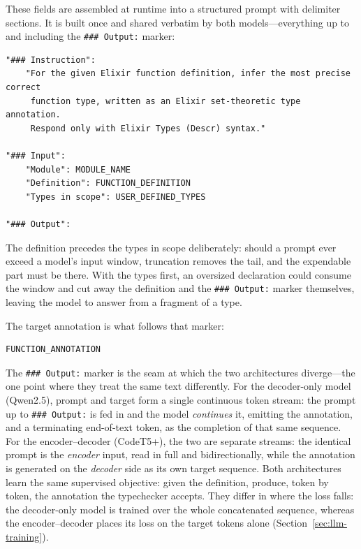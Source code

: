 These fields are assembled at runtime into a structured prompt with delimiter sections. It is built once and shared verbatim by both models---everything up to and including the \texttt{\#\#\# Output:} marker:
\begin{lstlisting}[numbers=none]
"### Instruction":
    "For the given Elixir function definition, infer the most precise correct
     function type, written as an Elixir set-theoretic type annotation.
     Respond only with Elixir Types (Descr) syntax."

"### Input":
    "Module": MODULE_NAME
    "Definition": FUNCTION_DEFINITION
    "Types in scope": USER_DEFINED_TYPES

"### Output":
\end{lstlisting}
The definition precedes the types in scope deliberately: should a prompt ever exceed a model's input window, truncation removes the tail, and the expendable part must be there.
With the types first, an oversized declaration could consume the window and cut away the definition and the \texttt{\#\#\# Output:} marker themselves, leaving the model to answer from a fragment of a type.

The target annotation is what follows that marker:
\begin{lstlisting}[numbers=none]
    FUNCTION_ANNOTATION
\end{lstlisting}
The \texttt{\#\#\# Output:} marker is the seam at which the two architectures diverge---the one point where they treat the same text differently.
For the decoder-only model (Qwen2.5), prompt and target form a single continuous token stream: the prompt up to \texttt{\#\#\# Output:} is fed in and the model \emph{continues} it, emitting the annotation, and a terminating end-of-text token, as the completion of that same sequence.
For the encoder--decoder (CodeT5+), the two are separate streams: the identical prompt is the \emph{encoder} input, read in full and bidirectionally, while the annotation is generated on the \emph{decoder} side as its own target sequence.
Both architectures learn the same supervised objective: given the definition, produce, token by token, the annotation the typechecker accepts. They differ in where the loss falls: the decoder-only model is trained over the whole concatenated sequence, whereas the encoder--decoder places its loss on the target tokens alone (Section~\ref{sec:llm-training}).

